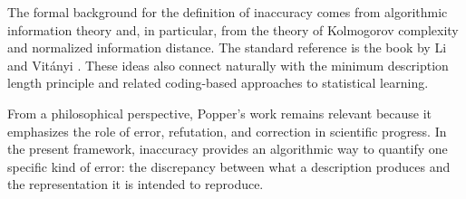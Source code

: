 The formal background for the definition of inaccuracy comes from algorithmic information theory and, in particular, from the theory of Kolmogorov complexity and normalized information distance. The standard reference is the book by Li and Vitányi \cite{li2008introduction}. These ideas also connect naturally with the minimum description length principle and related coding-based approaches to statistical learning.

From a philosophical perspective, Popper's work \cite{popper2014conjectures} remains relevant because it emphasizes the role of error, refutation, and correction in scientific progress. In the present framework, inaccuracy provides an algorithmic way to quantify one specific kind of error: the discrepancy between what a description produces and the representation it is intended to reproduce.













